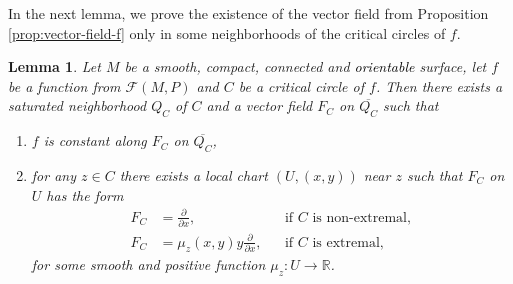 \documentclass[10pt,reqno]{amsart}
\newtheorem{lemma}[subsection]{Lemma}
\newcommand{\bbR}{\mathbb{R}}
\newcommand{\F}{\mathcal{F}(M,P)}
\newcommand{\textr}[1]{\textcolor{black}{#1}}
\begin{document}
In the next lemma, we prove the existence of the vector field  from  Proposition \ref{prop:vector-field-f} only in some neighborhoods of the critical circles of $f$.
\begin{lemma}\label{lm:vector-field-FC}
	Let $M$ be a smooth, compact, connected and \textr{orientable} surface, let $f$ be a function from $\F$ and $C$ be a critical circle of $f$. Then there exists a saturated neighborhood $Q_C$ of $C$ and a vector field $F_C$ on $\overline{Q_C}$ such that 
	\begin{enumerate}
		\item $f$ is constant along $F_C$ on $\overline{Q_C}$,
		\item for any $z\in C$ there exists a local chart $(U,(x,y))$ near $z$ such that $F_C$ on $U$ has the form
		\begin{align}
			F_C &= \frac{\partial}{\partial x},&& \text{if $C$ is non-extremal},\label{eq:FC-non-extremal}\\
			F_C &= \mu_z(x,y)y\frac{\partial }{\partial x}, && \text{if $C$ is extremal}\label{eq:FC-extremal},
		\end{align}
		for some smooth and positive function $\mu_z:U\to \bbR$.
	\end{enumerate}
\end{lemma}
\end{document}
